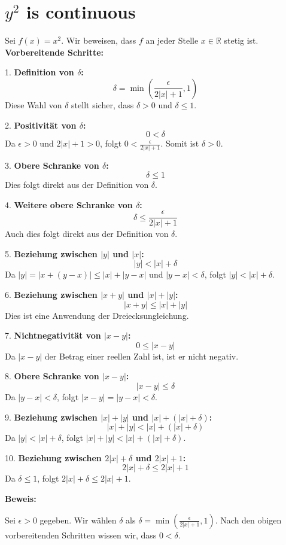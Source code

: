 \section{$y^2$ is continuous}

Sei $f(x) = x^2$. Wir beweisen, dass $f$ an jeder Stelle $x \in \mathbb{R}$ stetig ist. 
\textbf{Vorbereitende Schritte:}

1. \textbf{Definition von $\delta$:}
   \[
   \delta = \min\left(\frac{\epsilon}{2|x| + 1}, 1\right)
   \]
   Diese Wahl von $\delta$ stellt sicher, dass $\delta > 0$ und $\delta \leq 1$.

2. \textbf{Positivität von $\delta$:}
   \[
   0 < \delta
   \]
   Da $\epsilon > 0$ und $2|x| + 1 > 0$, folgt $0 < \frac{\epsilon}{2|x| + 1}$. Somit ist $\delta > 0$.

3. \textbf{Obere Schranke von $\delta$:}
   \[
   \delta \leq 1
   \]
   Dies folgt direkt aus der Definition von $\delta$.

4. \textbf{Weitere obere Schranke von $\delta$:}
   \[
   \delta \leq \frac{\epsilon}{2|x| + 1}
   \]
   Auch dies folgt direkt aus der Definition von $\delta$.

5. \textbf{Beziehung zwischen $|y|$ und $|x|$:}
   \[
   |y| < |x| + \delta
   \]
   Da $|y| = |x + (y - x)| \leq |x| + |y - x|$ und $|y - x| < \delta$, folgt $|y| < |x| + \delta$.

6. \textbf{Beziehung zwischen $|x + y|$ und $|x| + |y|$:}
   \[
   |x + y| \leq |x| + |y|
   \]
   Dies ist eine Anwendung der Dreiecksungleichung.

7. \textbf{Nichtnegativität von $|x - y|$:}
   \[
   0 \leq |x - y|
   \]
   Da $|x - y|$ der Betrag einer reellen Zahl ist, ist er nicht negativ.

8. \textbf{Obere Schranke von $|x - y|$:}
   \[
   |x - y| \leq \delta
   \]
   Da $|y - x| < \delta$, folgt $|x - y| = |y - x| < \delta$.

9. \textbf{Beziehung zwischen $|x| + |y|$ und $|x| + (|x| + \delta)$:}
   \[
   |x| + |y| < |x| + (|x| + \delta)
   \]
   Da $|y| < |x| + \delta$, folgt $|x| + |y| < |x| + (|x| + \delta)$.

10. \textbf{Beziehung zwischen $2|x| + \delta$ und $2|x| + 1$:}
    \[
    2|x| + \delta \leq 2|x| + 1
    \]
    Da $\delta \leq 1$, folgt $2|x| + \delta \leq 2|x| + 1$.

\textbf{Beweis:}

Sei $\epsilon > 0$ gegeben. Wir wählen $\delta$ als $\delta = \min\left(\frac{\epsilon}{2|x| + 1}, 1\right)$. Nach den obigen vorbereitenden Schritten wissen wir, dass $0 < \delta$.

